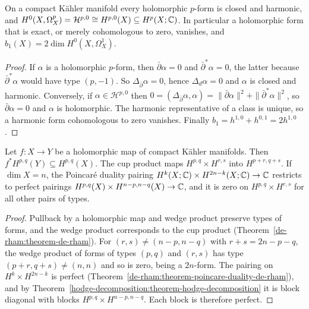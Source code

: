 \begin{proposition}\label{hodge-decomposition:proposition-holomorphic-forms}
On a compact K\"ahler manifold every holomorphic $p$-form is closed and harmonic, and
$H^0(X, \Omega^p_X) = \mathcal{H}^{p,0} \cong H^{p,0}(X) \subseteq H^p(X; \mathbb{C})$. In particular a holomorphic form that is exact, or
merely cohomologous to zero, vanishes, and $b_1(X) = 2\dim H^0(X, \Omega^1_X)$.
\end{proposition}

\begin{proof}
If $\alpha$ is a holomorphic $p$-form, then $\bar\partial\alpha = 0$ and $\bar\partial^*\alpha = 0$, the latter because
$\bar\partial^*\alpha$ would have type $(p, -1)$. So $\Delta_{\bar\partial}\alpha = 0$, hence $\Delta_d\alpha = 0$ and $\alpha$ is closed
and harmonic. Conversely, if $\alpha \in \mathcal{H}^{p,0}$ then
$0 = (\Delta_{\bar\partial}\alpha, \alpha) = \|\bar\partial\alpha\|^2 + \|\bar\partial^*\alpha\|^2$, so $\bar\partial\alpha = 0$ and $\alpha$ is holomorphic. The
harmonic representative of a class is unique, so a harmonic form cohomologous to zero vanishes. Finally $b_1 = h^{1,0} + h^{0,1} = 2h^{1,0}$.
\end{proof}

\begin{proposition}\label{hodge-decomposition:proposition-functoriality}
Let $f \colon X \to Y$ be a holomorphic map of compact K\"ahler manifolds. Then $f^*H^{p,q}(Y) \subseteq H^{p,q}(X)$. The cup product
maps $H^{p,q} \times H^{r,s}$ into $H^{p+r,q+s}$. If $\dim X = n$, the Poincar\'e duality pairing
$H^k(X; \mathbb{C}) \times H^{2n-k}(X; \mathbb{C}) \to \mathbb{C}$ restricts to perfect pairings $H^{p,q}(X) \times H^{n-p,n-q}(X) \to \mathbb{C}$, and it is zero on
$H^{p,q} \times H^{r,s}$ for all other pairs of types.
\end{proposition}

\begin{proof}
Pullback by a holomorphic map and wedge product preserve types of forms, and the wedge product corresponds to the cup product
(Theorem~\ref{de-rham:theorem-de-rham}). For $(r,s) \neq (n-p, n-q)$ with $r + s = 2n - p - q$, the wedge product of forms of types
$(p,q)$ and $(r,s)$ has type $(p+r, q+s) \neq (n,n)$ and so is zero, being a $2n$-form. The pairing on $H^k \times H^{2n-k}$ is perfect
(Theorem~\ref{de-rham:theorem-poincare-duality-de-rham}), and by
Theorem~\ref{hodge-decomposition:theorem-hodge-decomposition} it is block diagonal with blocks $H^{p,q} \times H^{n-p,n-q}$. Each block
is therefore perfect.
\end{proof}

